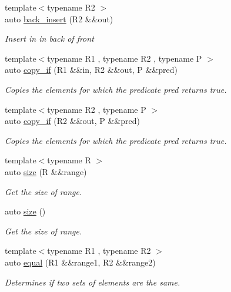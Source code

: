 \begin{DoxyCompactItemize}
{\footnotesize template$<$typename R2 $>$ }\\auto \mbox{\hyperlink{namespacerah_a1c3ab6d88fc54b3638ef699d465e86b4}{back\+\_\+insert}} (R2 \&\&out)
\begin{DoxyCompactList}\small\item\em Insert {\itshape in} in back of {\itshape front} \end{DoxyCompactList}\item 
{\footnotesize template$<$typename R1 , typename R2 , typename P $>$ }\\auto \mbox{\hyperlink{namespacerah_a550a133fe8c6de600a83959c82a0c592}{copy\+\_\+if}} (R1 \&\&in, R2 \&\&out, P \&\&pred)
\begin{DoxyCompactList}\small\item\em Copies the elements for which the predicate pred returns true. \end{DoxyCompactList}\item 
{\footnotesize template$<$typename R2 , typename P $>$ }\\auto \mbox{\hyperlink{namespacerah_a1f17e9431b258cc701fa59672a65d7db}{copy\+\_\+if}} (R2 \&\&out, P \&\&pred)
\begin{DoxyCompactList}\small\item\em Copies the elements for which the predicate pred returns true. \end{DoxyCompactList}\item 
{\footnotesize template$<$typename R $>$ }\\auto \mbox{\hyperlink{namespacerah_a85af749badb4261aa3c97a1d98134493}{size}} (R \&\&range)
\begin{DoxyCompactList}\small\item\em Get the size of range. \end{DoxyCompactList}\item 
auto \mbox{\hyperlink{namespacerah_aaee48fa7a804b4fd19c6a78bdd8d4c85}{size}} ()
\begin{DoxyCompactList}\small\item\em Get the size of range. \end{DoxyCompactList}\item 
{\footnotesize template$<$typename R1 , typename R2 $>$ }\\auto \mbox{\hyperlink{namespacerah_abf321dffb33d6a2d752aa091fdba7bbf}{equal}} (R1 \&\&range1, R2 \&\&range2)
\begin{DoxyCompactList}\small\item\em Determines if two sets of elements are the same. \end{DoxyCompactList}\item 

\end{DoxyCompactItemize}
